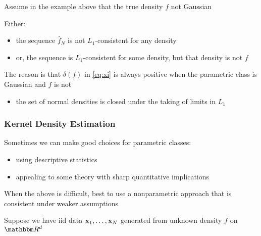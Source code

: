 \begin{frame}

    \vspace{2em}
    \Eg
    Assume in the example above that the true
    density $f$ not Gaussian
    
    Either:
    \begin{itemize}
        \item the sequence $\hat f_N$ is not
        $L_1$-consistent for any density
        \item or, the sequence is $L_1$-consistent for some density,
        but that density is not $f$
    \end{itemize}
    
    \vspace{.7em}
    The reason is that $\delta(f)$ in \eqref{eq:xi}
    is always positive when the parametric class is Gaussian and $f$ is not
    \begin{itemize}
        \item the set of normal densities is closed under the taking of limits in
        $L_1$
    \end{itemize}
  
    
\end{frame}

\begin{frame}\frametitle{Kernel Density Estimation}
    
    \vspace{2em}
    Sometimes we can make good choices for parametric classes:
    \begin{itemize}
        \item using descriptive
    statistics
        \item appealing to some theory with sharp quantitative
    implications
    \end{itemize}
    
    \vspace{.7em}
    When the above is difficult, 
    best to use a nonparametric approach that is consistent under weaker
    assumptions
    
    Suppose we have {\sc iid} data ${\mathbf x}_1,\ldots,{\mathbf x}_N$ generated from
    unknown density $f$ on $\RR^d$
    

\end{frame}

